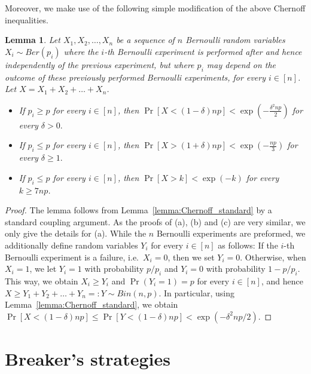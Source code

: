 \documentclass[11pt, a4paper]{article}
\numberwithin{equation}{section}
\numberwithin{figure}{section}
\newtheorem{lemma}[theorem]{Lemma}
\newcommand{\Prob}{\operatorname{Pr}}
\begin{document}
Moreover, we make use of the following simple modification of the above Chernoff inequalities.

\begin{lemma}\label{lemma:Chernoff_modified}
Let $X_1,X_2,\ldots,X_n$ be a sequence of
$n$ Bernoulli random variables 
$X_i\sim Ber(p_i)$ where the $i$-th 
Bernoulli experiment is performed
after and hence independently of
the previous experiment, but where
$p_i$ may depend on the outcome
of these previously performed Bernoulli experiments,
for every $i\in [n]$.
Let $X = X_1+X_2+\ldots+X_n$.
\begin{itemize}
    \item[(a)] If $p_i\geq p$ for every $i\in [n]$, then
    $\Prob[X<(1-\delta)np]<\exp\left(-\frac{\delta^2np}{2}\right)$ for every $\delta>0.$
    \item[(b)] If $p_i\leq p$ for every $i\in [n]$, then 
    $\Prob[X>(1+\delta)np]<\exp\left(-\frac{np}{3}\right)$ for every $\delta\geq 1.$
    \item[(c)] If $p_i\leq p$ for every $i\in [n]$, then 
    $\Prob[X>k]<\exp\left(-k\right)$ for every $k\geq 7np$.
\end{itemize}
\end{lemma}

\begin{proof}
The lemma follows from Lemma~\ref{lemma:Chernoff_standard}
by a standard coupling argument. As the proofs of (a), (b) and (c) are very similar, we only give the details for (a).
While the $n$ Bernoulli experiments are preformed,
we additionally define random variables $Y_i$
for every $i\in [n]$ as follows:
If the $i$-th Bernoulli experiment is a failure, i.e.~$X_i=0$,
then we set $Y_i=0$. Otherwise, when $X_i=1$,
we let $Y_i=1$ with probability $p/p_i$ and
$Y_i=0$ with probability $1-p/p_i$.
This way, we obtain $X_i\geq Y_i$ 
and $\Prob(Y_i=1)=p$ for every $i\in [n]$, and hence
$X\geq Y_1+Y_2+\ldots+Y_n =:Y \sim Bin(n,p)$.
In particular, using Lemma~\ref{lemma:Chernoff_standard},
we obtain
$
\Prob[X<(1-\delta)np]
\leq
\Prob[Y<(1-\delta)np]
<
\exp(-\delta^2np/2)
$.
\end{proof} 







\bigskip


\section{Breaker's strategies}\label{sec:breaker.strategies}
\end{document}
